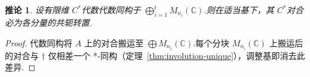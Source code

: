 \documentclass[math-font=lm, text-font=lm, math-style=TeX]{sjtureport}
\newtheorem{corollary}[theorem]{推论}
\theoremstyle{plain}
\newtheorem*{proof}{证明}
\theoremstyle{plain}
\begin{document}
\begin{corollary}\label{cor:direct-sum}
设有限维 $C^*$代数代数同构于 $\bigoplus_{i=1}^t M_{n_i}(\mathbb{C})$.则在适当基下，其 $C^*$对合必为各分量的共轭转置.
\end{corollary}
\begin{proof}
代数同构将 $A$ 上的对合搬运至 $\bigoplus M_{n_i}(\mathbb{C})$.每个分块 $M_{n_i}(\mathbb{C})$ 上搬运后的对合与 $\dagger$ 仅相差一个 *-同构（定理~\ref{thm:involution-unique}），调整基即消去此差异.
\end{proof}
\end{document}
